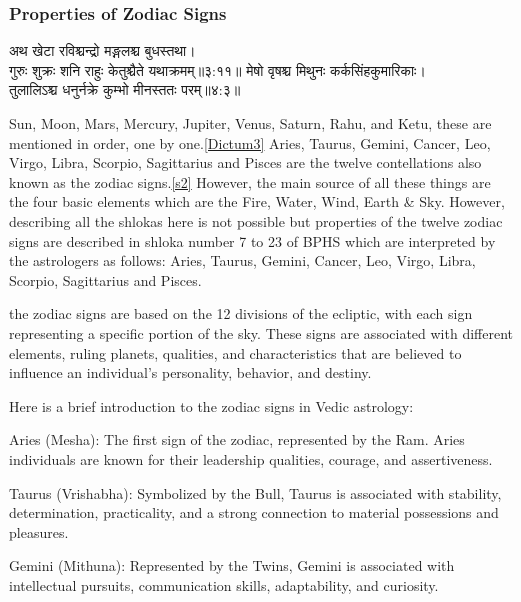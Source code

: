 \subsubsection{Properties of Zodiac Signs}
\begin{sanskrit}
	\begin{center}
		अथ खेटा रविश्चन्द्रो मङ्गलश्च बुधस्तथा।\\गुरुः शुक्रः शनि राहुः केतुश्चैते यथाक्रमम्‌॥३:११॥\cite{BrihatParasharHoraShastraVol1, wiki:bphs}\label{Dictum3}
		मेषो वृषश्च मिथुनः कर्कसिंहकुमारिकाः।\\तुलालिऽश्च धनुर्नक्रे कुम्भो मीनस्ततः परम्‌॥४:३॥\cite{BrihatParasharHoraShastraVol1, wiki:bphs}\label{s2}
	\end{center}
\end{sanskrit}
Sun, Moon, Mars, Mercury, Jupiter, Venus, Saturn, Rahu, and Ketu, these are mentioned in order, one by one.\ref{Dictum3}
Aries, Taurus, Gemini, Cancer, Leo, Virgo, Libra, Scorpio, Sagittarius and Pisces are the twelve contellations also known as the zodiac signs.\ref{s2}
However, the main source of all these things are the four basic elements which are the Fire, Water, Wind, Earth \& Sky.
However, describing all the shlokas here is not possible but properties of the twelve zodiac signs are described in shloka number 7 to 23 of BPHS\cite{BrihatParasharHoraShastraVol1, wiki:bphs} which are interpreted by the astrologers as follows:
Aries, Taurus, Gemini, Cancer, Leo, Virgo, Libra, Scorpio, Sagittarius and Pisces.

the zodiac signs are based on the 12 divisions of the ecliptic, with each sign representing a specific portion of the sky. These signs are associated with different elements, ruling planets, qualities, and characteristics that are believed to influence an individual's personality, behavior, and destiny.

Here is a brief introduction to the zodiac signs in Vedic astrology:

Aries (Mesha): The first sign of the zodiac, represented by the Ram. Aries individuals are known for their leadership qualities, courage, and assertiveness.

Taurus (Vrishabha): Symbolized by the Bull, Taurus is associated with stability, determination, practicality, and a strong connection to material possessions and pleasures.

Gemini (Mithuna): Represented by the Twins, Gemini is associated with intellectual pursuits, communication skills, adaptability, and curiosity.

